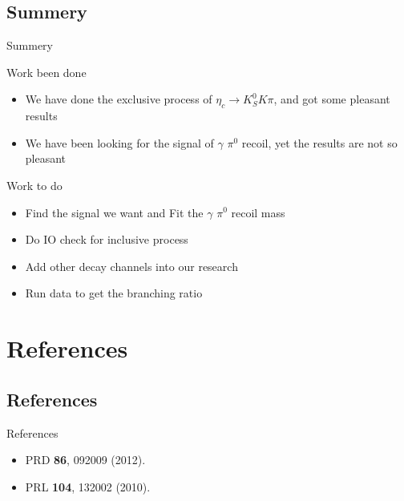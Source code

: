 \documentclass{beamer}
\begin{document}
\subsection{Summery}
\begin{frame}{Summery}
\begin{block}{Work been done}
\begin{itemize}
\item We have done the exclusive process of $\eta_c\to K^0_S K \pi$, and got some pleasant results
\item We have been looking for the signal of $\gamma$ $\pi^0$ recoil, yet the results are not so pleasant
\end{itemize}
\end{block}
\begin{block}{Work to do}
\begin{itemize}
\item Find the signal we want and Fit the $\gamma$ $\pi^0$ recoil mass
\item Do IO check for inclusive process
\item Add other decay channels into our research
\item Run data to get the branching ratio
\end{itemize}
\end{block}
\end{frame}

\section{References}
\subsection{References}
\begin{frame}{References}
\begin{itemize}
\item  PRD \textbf{86}, 092009 (2012).
\item  PRL \textbf{104}, 132002 (2010).
\end{itemize}
\end{frame}
\end{document}
